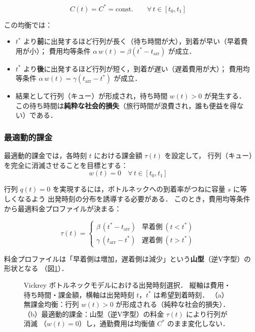 \begin{equation}
  C(t) = C^* = \text{const.}
  \qquad \forall\, t \in [t_0, t_1]
  \label{eq:departure-equilibrium}
\end{equation}

この均衡では：
\begin{itemize}
  \item $t^*$ より\textbf{前}に出発するほど行列が長く（待ち時間が大），到着が早い（早着費用が小）；
        費用均等条件 $\alpha\, w(t) = \beta(t^* - t_{\text{arr}})$ が成立．
  \item $t^*$ より\textbf{後}に出発するほど行列が短く，到着が遅い（遅着費用が大）；
        費用均等条件 $\alpha\, w(t) = \gamma(t_{\text{arr}} - t^*)$ が成立．
  \item 結果として行列（キュー）が形成され，待ち時間 $w(t) > 0$ が発生する．
        この待ち時間は\textbf{純粋な社会的損失}（旅行時間が浪費され，誰も便益を得ない）である．
\end{itemize}

\subsubsection*{最適動的課金}

最適動的課金では，各時刻 $t$ における課金額 $\tau(t)$ を設定して，
行列（キュー）を完全に消滅させることを目標とする：
\begin{equation}
  w(t) = 0
  \quad \forall\, t \in [t_0, t_1]
  \label{eq:queue-free}
\end{equation}

行列 $q(t) = 0$ を実現するには，ボトルネックへの到着率がつねに容量 $s$ に等しくなるよう
出発時刻の分布を誘導する必要がある．
このとき，費用均等条件から最適料金プロファイルが決まる：

\begin{equation}
  \tau(t) =
  \begin{cases}
    \beta\,(t^* - t_{\text{arr}}) & \text{早着側}\ (t < t^*) \\
    \gamma\,(t_{\text{arr}} - t^*) & \text{遅着側}\ (t > t^*)
  \end{cases}
  \label{eq:optimal-dynamic-toll}
\end{equation}

料金プロファイルは「早着側は増加，遅着側は減少」という\textbf{山型}（逆V字型）の形状となる
（図\ref{fig:vickrey-bottleneck}）．

\begin{figure}[hbtp]
  \centering
  
  \caption{Vickrey ボトルネックモデルにおける出発時刻選択．
           縦軸は費用・待ち時間・課金額，横軸は出発時刻 $t$，$t^*$ は希望到着時刻．
           （a）無課金均衡：行列 $w(t) > 0$ が形成される（純粋な社会的損失）．
           （b）最適動的課金：山型（逆V字型）の料金 $\tau(t)$ により行列が消滅
           （$w(t) = 0$）し，通勤費用は均衡値 $C^*$ のまま変化しない．}
  \label{fig:vickrey-bottleneck}
\end{figure}


